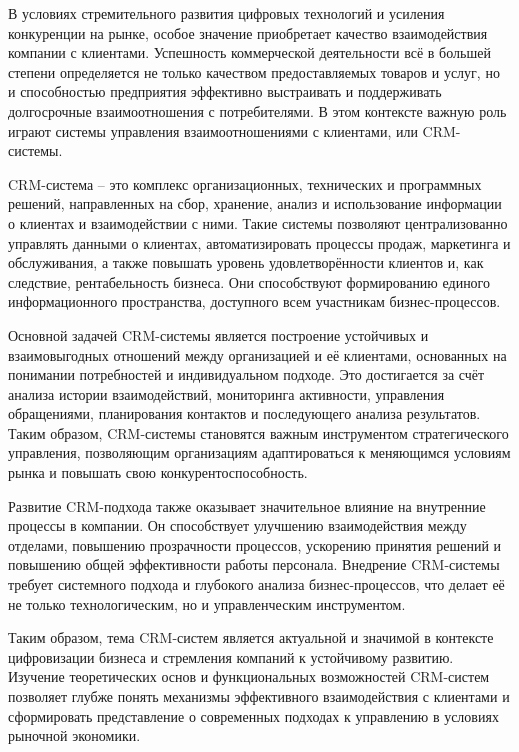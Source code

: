 \label{sec:intro}

В условиях стремительного развития цифровых технологий и усиления конкуренции на рынке, особое значение
приобретает качество взаимодействия компании с клиентами. Успешность коммерческой деятельности всё в большей
степени определяется не только качеством предоставляемых товаров и услуг, но и способностью предприятия эффективно
выстраивать и поддерживать долгосрочные взаимоотношения с потребителями. В этом контексте важную роль играют системы
управления взаимоотношениями с клиентами, или CRM-системы.


CRM-система -- это комплекс организационных, технических и программных решений, направленных на сбор, хранение,
анализ и использование информации о клиентах и взаимодействии с ними. Такие системы позволяют централизованно управлять
данными о клиентах, автоматизировать процессы продаж, маркетинга и обслуживания, а также повышать уровень
удовлетворённости клиентов и, как следствие, рентабельность бизнеса. Они способствуют формированию единого
информационного пространства, доступного всем участникам бизнес-процессов.


Основной задачей CRM-системы является построение устойчивых и взаимовыгодных отношений между организацией и её
клиентами, основанных на понимании потребностей и индивидуальном подходе. Это достигается за счёт анализа истории
взаимодействий, мониторинга активности, управления обращениями, планирования контактов и последующего анализа
результатов. Таким образом, CRM-системы становятся важным инструментом стратегического управления, позволяющим
организациям адаптироваться к меняющимся условиям рынка и повышать свою конкурентоспособность.


Развитие CRM-подхода также оказывает значительное влияние на внутренние процессы в компании. Он способствует улучшению
взаимодействия между отделами, повышению прозрачности процессов, ускорению принятия решений и повышению общей
эффективности работы персонала. Внедрение CRM-системы требует системного подхода и глубокого анализа бизнес-процессов,
что делает её не только технологическим, но и управленческим инструментом.


Таким образом, тема CRM-систем является актуальной и значимой в контексте цифровизации бизнеса и стремления компаний к
устойчивому развитию. Изучение теоретических основ и функциональных возможностей CRM-систем позволяет глубже понять
механизмы эффективного взаимодействия с клиентами и сформировать представление о современных подходах к управлению в
условиях рыночной экономики.